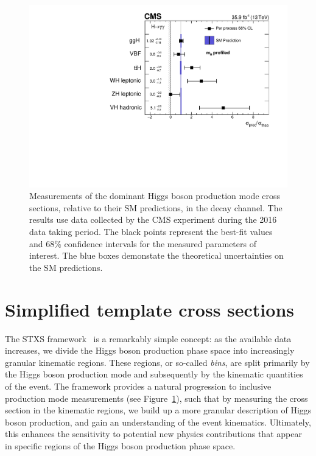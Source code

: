 \begin{figure}[htb!]
  \centering
  \includegraphics[width=.7\linewidth]{Figures/theory/hig16040_stage0.pdf}
  \caption[Measurements of Higgs boson production cross section in the \Hgg channel, using the 2016 data set]
  {
    Measurements of the dominant Higgs boson production mode cross sections, relative to their SM predictions, in the \Hgg decay channel. The results use data collected by the CMS experiment during the 2016 data taking period. The black points represent the best-fit values and 68\% confidence intervals for the measured parameters of interest. The blue boxes demonstate the theoretical uncertainties on the SM predictions.
  }
  \label{fig:hig16040_stage0}
\end{figure}

\section{Simplified template cross sections}\label{sec:theory_stxs}
The STXS framework~\cite{deFlorian:2016spz} is a remarkably simple concept: as the available data increases, we divide the Higgs boson production phase space into increasingly granular kinematic regions. These regions, or so-called \textit{bins}, are split primarily by the Higgs boson production mode and subsequently by the kinematic quantities of the event. The framework provides a natural progression to inclusive production mode measurements (see Figure~\ref{fig:hig16040_stage0}), such that by measuring the cross section in the kinematic regions, we build up a more granular description of Higgs boson production, and gain an understanding of the event kinematics. Ultimately, this enhances the sensitivity to potential new physics contributions that appear in specific regions of the Higgs boson production phase space.


